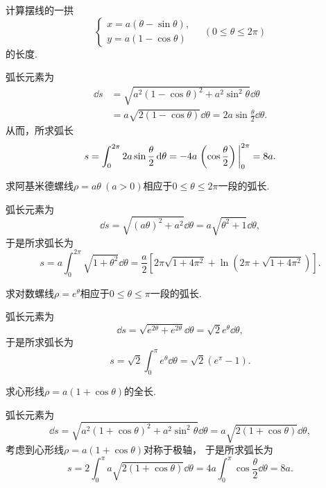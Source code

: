 \begin{example}
计算摆线的一拱\[
	\left\{ \begin{array}{l}
		x = a (\theta - \sin\theta), \\
		y = a (1 - \cos\theta)
	\end{array} \right.
	\quad(0 \leq \theta \leq 2\pi)
\]的长度.
\begin{solution}
弧长元素为\begin{align*}
	\dd{s} &= \sqrt{a^2 (1 - \cos\theta)^2 + a^2 \sin^2\theta} \dd{\theta} \\
	&= a \sqrt{2 (1 - \cos\theta)} \dd{\theta}
	= 2 a \sin\frac\theta2 \dd{\theta}.
\end{align*}
从而，所求弧长\[
	s = \int_0^{2\pi} 2a \sin\frac\theta2 \dd{\theta}
	= -4a \eval{\left(\cos\frac\theta2\right)}_0^{2\pi}
	= 8a.
\]
\end{solution}
\end{example}

\begin{example}
求阿基米德螺线\(\rho=a\theta\ (a>0)\)相应于\(0\leq\theta\leq2\pi\)一段的弧长.
\begin{solution}
弧长元素为\[
	\dd{s} = \sqrt{(a\theta)^2 + a^2} \dd{\theta}
	= a\sqrt{\theta^2+1} \dd{\theta},
\]
于是所求弧长为\[
	s = a \int_0^{2\pi} \sqrt{1+\theta^2} \dd{\theta}
	= \frac{a}{2} \left[
	2\pi\sqrt{1+4\pi^2} + \ln(2\pi+\sqrt{1+4\pi^2})
	\right].
\]
\end{solution}
\end{example}

\begin{example}
求对数螺线\(\rho=e^{\theta}\)相应于\(0\leq\theta\leq\pi\)一段的弧长.
\begin{solution}
弧长元素为\[
	\dd{s} = \sqrt{e^{2\theta}+e^{2\theta}} \dd{\theta}
	= \sqrt{2}e^{\theta} \dd{\theta},
\]
于是所求弧长为\[
	s = \sqrt{2} \int_0^\pi e^{\theta} \dd{\theta}
	= \sqrt{2} (e^\pi-1).
\]
\end{solution}
\end{example}

\begin{example}
求心形线\(\rho=a(1+\cos\theta)\)的全长.
\begin{solution}
弧长元素为\[
	\dd{s} = \sqrt{a^2(1+\cos\theta)^2+a^2\sin^2\theta} \dd{\theta}
	= a \sqrt{2(1+\cos\theta)} \dd{\theta},
\]
考虑到心形线\(\rho=a(1+\cos\theta)\)对称于极轴，
于是所求弧长为\[
	s = 2 \int_0^\pi a \sqrt{2(1+\cos\theta)} \dd{\theta}
	= 4a \int_0^\pi \cos\frac\theta2 \dd{\theta}
	= 8a.
\]
\end{solution}
\end{example}

